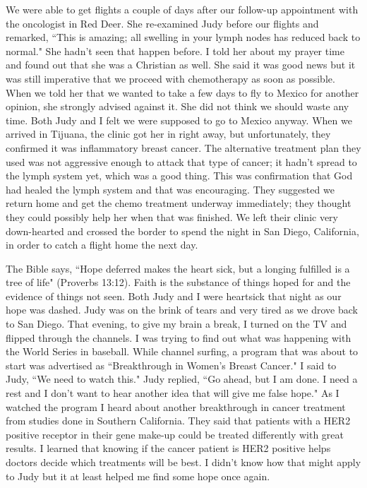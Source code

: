\documentclass[oneside]{book}
\begin{document}
We were able to get flights a couple of days after our follow-up appointment with the oncologist in Red Deer. She re-examined Judy before our flights and remarked, ``This is amazing; all swelling in your lymph nodes has reduced back to normal." She hadn't seen that happen before. I told her about my prayer time and found out that she was a Christian as well. She said it was good news but it was still imperative that we proceed with chemotherapy as soon as possible. When we told her that we wanted to take a few days to fly to Mexico for another opinion, she strongly advised against it. She did not think we should waste any time. Both Judy and I felt we were supposed to go to Mexico anyway. When we arrived in Tijuana, the clinic got her in right away, but unfortunately, they confirmed it was inflammatory breast cancer. The alternative treatment plan they used was not aggressive enough to attack that type of cancer; it hadn't spread to the lymph system yet, which was a good thing. This was confirmation that God had healed the lymph system and that was encouraging. They suggested we return home and get the chemo treatment underway immediately; they thought they could possibly help her when that was finished. We left their clinic very down-hearted and crossed the border to spend the night in San Diego, California, in order to catch a flight home the next day. 

The Bible says, ``Hope deferred makes the heart sick, but a longing fulfilled is a tree of life" (Proverbs 13:12). Faith is the substance of things hoped for and the evidence of things not seen. Both Judy and I were heartsick that night as our hope was dashed. Judy was on the brink of tears and very tired as we drove back to San Diego. That evening, to give my brain a break, I turned on the TV and flipped through the channels. I was trying to find out what was happening with the World Series in baseball. While channel surfing, a program that was about to start was advertised as ``Breakthrough in Women's Breast Cancer." I said to Judy, ``We need to watch this." Judy replied, ``Go ahead, but I am done. I need a rest and I don't want to hear another idea that will give me false hope."  As I watched the program I heard about another breakthrough in cancer treatment from studies done in Southern California. They said that patients with a HER2 positive receptor in their gene make-up could be treated differently with great results. I learned that knowing if the cancer patient is HER2 positive helps doctors decide which treatments will be best. I didn't know how that might apply to Judy but it at least helped me find some hope once again.
\end{document}
